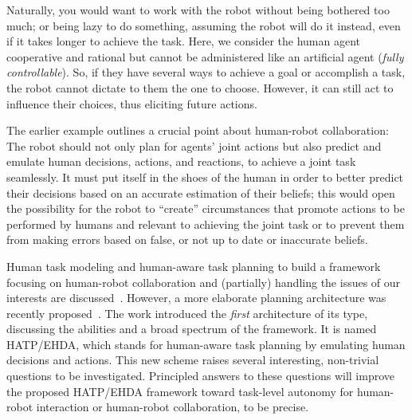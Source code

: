 \documentclass[letterpaper]{article} %
\begin{document}
Naturally, you would want to work with the robot without being bothered too much; or being lazy to do something, assuming the robot will do it instead, even if it takes longer to achieve the task. Here, we consider the human agent cooperative and rational but cannot be administered like an artificial agent (\textit{fully controllable}). So, if they have several ways to achieve a goal or accomplish a task, the robot cannot dictate to them the one to choose. However, it can still act to influence their choices, thus eliciting future actions. 

The earlier example outlines a crucial point about human-robot collaboration: The robot should not only plan for agents' joint actions but also predict and emulate human decisions, actions, and reactions, to achieve a joint task seamlessly. 
It must put itself in the shoes of the human in order to better predict their decisions based on an accurate estimation of their beliefs; this would open the possibility for the robot to “create” circumstances that promote actions to be performed by humans and relevant to achieving the joint task or to prevent them from making errors based on false, or not up to date or inaccurate beliefs.



Human task modeling and human-aware task planning to build a framework focusing on human-robot collaboration and (partially) handling the issues of our interests are discussed~\cite{alami2006toward,montreuil2007planning,alili2009planning,alili2009task,lallement2014hatp,de2015hatp,lallement2018hatp}.
However, a more elaborate planning architecture was recently proposed~\cite{BuisanA21,buisan:hal-03684211}.
The work introduced the \textit{first} architecture of its type, discussing the abilities and a broad spectrum of the framework.
It is named HATP/EHDA, which stands for human-aware task planning by emulating human decisions and actions. This new scheme raises several interesting, non-trivial questions to be investigated. Principled answers to these questions will improve the proposed HATP/EHDA framework toward task-level autonomy for human-robot interaction or human-robot collaboration, to be precise. 
\end{document}
